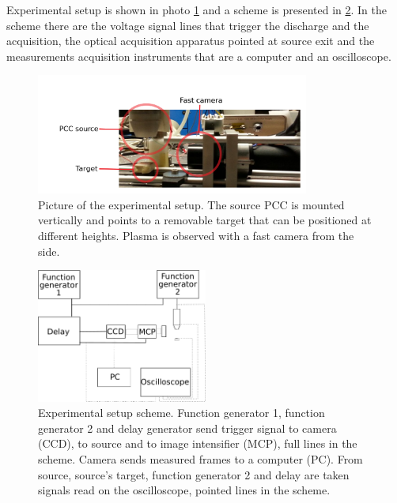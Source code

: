 Experimental setup is shown in photo \ref{fig:fotosetup} and a scheme is presented in \ref{fig:schemashape}. In the scheme there are the voltage signal lines that trigger the discharge and the acquisition, the optical acquisition apparatus pointed at source exit and the measurements acquisition instruments that are a computer and an oscilloscope. 
\begin{figure}
 \centering
 \includegraphics[width=0.8\textwidth]{Images/Shape/app_pic.png}
 \caption{Picture of the experimental setup. The source PCC is mounted vertically and points to a removable target that can be positioned at different heights. Plasma is observed with a fast camera from the side.}
 \label{fig:fotosetup}
\end{figure}
\begin{figure}
 \centering
 \includegraphics[width=0.5\textwidth]{Images/Shape/acq_ottica.png}
 \caption{Experimental setup scheme. Function generator 1, function generator 2 and delay generator send trigger signal to camera (CCD), to source and to image intensifier (MCP), full lines in the scheme. Camera sends measured frames to a computer (PC). From source, source's target, function generator 2 and delay are taken signals read on the oscilloscope, pointed lines in the scheme.}
 \label{fig:schemashape}
\end{figure}

